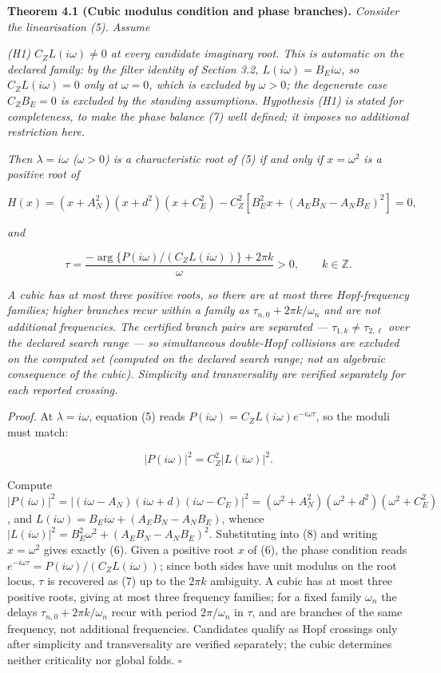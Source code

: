 \documentclass[11pt]{article}
\begin{document}
\textbf{Theorem 4.1 (Cubic modulus condition and phase branches).}
\emph{Consider the linearisation (5). Assume}

\emph{(H1) \(C_Z L(i\omega) \neq 0\) at every candidate imaginary root.
This is automatic on the declared family: by the filter identity of
Section 3.2, \(L(i\omega) = B_E i\omega\), so \(C_Z L(i\omega) = 0\)
only at \(\omega = 0\), which is excluded by \(\omega > 0\); the
degenerate case \(C_Z B_E = 0\) is excluded by the standing assumptions.
Hypothesis (H1) is stated for completeness, to make the phase balance
(7) well defined; it imposes no additional restriction here.}

\emph{Then \(\lambda = i\omega\) (\(\omega > 0\)) is a characteristic
root of (5) if and only if \(x = \omega^2\) is a positive root of}

\[H(x) = (x + A_N^2)(x + d^2)(x + C_E^2) - C_Z^2\left[ B_E^2 x + (A_E B_N - A_N B_E)^2 \right] = 0, \tag{6}\]

\emph{and}

\[\tau = \frac{-\arg\{P(i\omega)/(C_Z L(i\omega))\} + 2\pi k}{\omega} > 0, \qquad k \in \mathbb{Z}. \tag{7}\]

\emph{A cubic has at most three positive roots, so there are at most
three Hopf-frequency families; higher branches recur within a family as
\(\tau_{n,0} + 2\pi k/\omega_n\) and are not additional frequencies. The
certified branch pairs are separated ---
\(\tau_{1,k} \neq \tau_{2,\ell}\) over the declared search range --- so
simultaneous double-Hopf collisions are excluded on the computed set
(computed on the declared search range; not an algebraic consequence of
the cubic). Simplicity and transversality are verified separately for
each reported crossing.}

\emph{Proof.} At \(\lambda = i\omega\), equation (5) reads
\(P(i\omega) = C_Z L(i\omega)e^{-i\omega\tau}\), so the moduli must
match:

\[|P(i\omega)|^2 = C_Z^2 |L(i\omega)|^2. \tag{8}\]

Compute
\(|P(i\omega)|^2 = |(i\omega - A_N)(i\omega + d)(i\omega - C_E)|^2 = (\omega^2 + A_N^2)(\omega^2 + d^2)(\omega^2 + C_E^2)\),
and \(L(i\omega) = B_E i\omega + (A_E B_N - A_N B_E)\), whence
\(|L(i\omega)|^2 = B_E^2\omega^2 + (A_E B_N - A_N B_E)^2\). Substituting
into (8) and writing \(x = \omega^2\) gives exactly (6). Given a
positive root \(x\) of (6), the phase condition reads
\(e^{-i\omega\tau} = P(i\omega)/(C_Z L(i\omega))\); since both sides
have unit modulus on the root locus, \(\tau\) is recovered as (7) up to
the \(2\pi k\) ambiguity. A cubic has at most three positive roots,
giving at most three frequency families; for a fixed family \(\omega_n\)
the delays \(\tau_{n,0} + 2\pi k/\omega_n\) recur with period
\(2\pi/\omega_n\) in \(\tau\), and are branches of the same frequency,
not additional frequencies. Candidates qualify as Hopf crossings only
after simplicity and transversality are verified separately; the cubic
determines neither criticality nor global folds. \ensuremath{\square}
\end{document}
